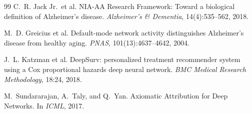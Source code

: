 \begin{thebibliography}{99}
C.~R. Jack Jr.\ et al.
\newblock NIA-AA Research Framework: Toward a biological definition of Alzheimer's disease.
\newblock \emph{Alzheimer's \& Dementia}, 14(4):535--562, 2018.

M.~D. Greicius et al.
\newblock Default-mode network activity distinguishes Alzheimer's disease from healthy
  aging.
\newblock \emph{PNAS}, 101(13):4637--4642, 2004.

J.~L. Katzman et al.
\newblock DeepSurv: personalized treatment recommender system using a Cox proportional
  hazards deep neural network.
\newblock \emph{BMC Medical Research Methodology}, 18:24, 2018.

M.~Sundararajan, A.~Taly, and Q.~Yan.
\newblock Axiomatic Attribution for Deep Networks.
\newblock In \emph{ICML}, 2017.


\end{thebibliography}
